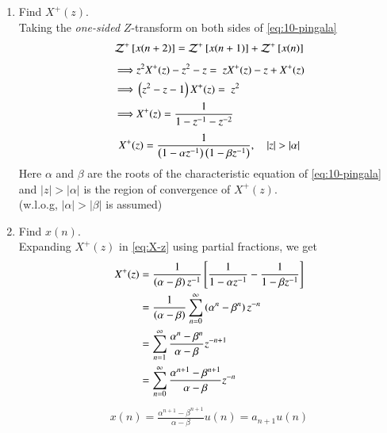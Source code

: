 \documentclass[journal,12pt,twocolumn]{IEEEtran}
\renewcommand\thesection{\arabic{section}}
\begin{document}
\begin{enumerate}[label=\thesection.\arabic*,ref=\thesection.\theenumi]
\newpage


\item Find $X^{+}(z)$. \\
	\solution Taking the {\em one-sided} $Z$-transform on both sides of \eqref{eq:10-pingala}
	\[
		\mathcal{Z}^+{}\left[x(n + 2)\right] = \mathcal{Z}^+{}\left[x(n + 1)\right] + \mathcal{Z}^+{}\left[x(n)\right]
	\]
	\begin{align*}
		\implies &z^2X^+(z) - z^2 - z = \ zX^+(z) - z + X^+(z) \\
		\implies &\left(z^2 - z - 1\right) X^+(z) = \ z^2 \\
		\implies &X^+(z) = \frac{1}{1 - z^{-1} - z^{-2}}
	\end{align*}
	\begin{align}
		X^+(z) = \frac{1}{\left(1 - \alpha z^{-1}\right)\left(1 - \beta z^{-1}\right)}, \quad |z| > |\alpha|
		\label{eq:X-z}
	\end{align}
	Here $\alpha$ and $\beta$ are the roots of the characteristic equation of \eqref{eq:10-pingala} and $|z| > |\alpha|$ is the region of convergence of $X^+(z)$. \\
	(w.l.o.g, $|\alpha| > |\beta|$ is assumed)


\item Find $x(n)$. \\
	\solution Expanding $X^+(z)$ in \eqref{eq:X-z} using partial fractions, we get
	\begin{align*}
		X^+(z) &= \frac{1}{\left(\alpha - \beta\right)z^{-1}}{}\left[\frac{1}{1 - \alpha z^{-1}} - \frac{1}{1 - \beta z^{-1}}\right] \\
			&= \frac{1}{\left(\alpha - \beta\right)}\sum_{n = 0}^{\infty}\left(\alpha^n - \beta^n\right)z^{-n} \\
			&= \sum_{n = 1}^\infty \frac{\alpha^{n} - \beta^{n}}{\alpha - \beta}z^{-n + 1} \\
			&= \sum_{n = 0}^\infty \frac{\alpha^{n + 1} - \beta^{n + 1}}{\alpha - \beta}z^{-n}
	\end{align*}
	\begin{align}
		x(n) = \frac{\alpha^{n + 1} - \beta^{n + 1}}{\alpha - \beta}u(n) = a_{n + 1}u(n)
		\label{eq:x-n}
	\end{align}



\end{enumerate}
\end{document}
